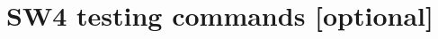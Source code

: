 \documentclass[11pt]{report}
\begin{document}



\section{SW4 testing commands [optional]}

\end{document}
